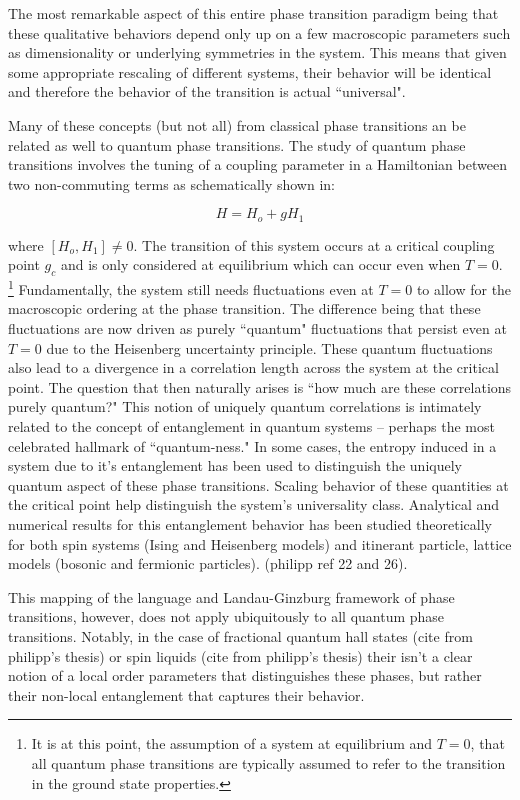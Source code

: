 The most remarkable aspect of this entire phase transition paradigm being that these qualitative behaviors depend only up on a few macroscopic parameters such as dimensionality or underlying symmetries in the system. This means that given some appropriate rescaling of different systems, their behavior will be identical and therefore the behavior of the transition is actual ``universal". 

Many of these concepts (but not all) from classical phase transitions an be related as well to quantum phase transitions. The study of quantum phase transitions involves the tuning of a coupling parameter in a Hamiltonian between two non-commuting terms as schematically shown in: 

\begin{equation}
\label{eqn:gHam}
H= H_o + g H_1
\end{equation}

where $ [H_o,H_1]\neq0$. The transition of this system occurs at a critical coupling point $g_c$ and is only considered at equilibrium which can occur even when $T=0$. \footnote{It is at this point, the assumption of a system at equilibrium and $T=0$, that all quantum phase transitions are typically assumed to refer to the transition in the ground state properties.} Fundamentally, the system still needs fluctuations even at $T=0$ to allow for the macroscopic ordering at the phase transition. The difference being that these fluctuations are now driven as purely ``quantum" fluctuations that persist even at $T=0$ due to the Heisenberg uncertainty principle. These quantum fluctuations also lead to a divergence in a correlation length across the system at the critical point. The question that then naturally arises is ``how much are these correlations purely quantum?" This notion of uniquely quantum correlations is intimately related to the concept of entanglement in quantum systems -- perhaps the most celebrated hallmark of ``quantum-ness." In some cases, the entropy induced in a system due to it's entanglement has been used to distinguish the uniquely quantum aspect of these phase transitions. Scaling behavior of these quantities at the critical point help distinguish the system's universality class. Analytical and numerical results for this entanglement behavior has been studied theoretically for both spin systems (Ising and Heisenberg models) and itinerant particle, lattice models (bosonic and fermionic particles). (philipp ref 22 and 26).

This mapping of the language and Landau-Ginzburg framework of  phase transitions, however, does not apply ubiquitously to all quantum phase transitions. Notably, in the case of fractional quantum hall states (cite from philipp's thesis) or spin liquids (cite from philipp's thesis) their isn't a clear notion of a local order parameters that distinguishes these phases, but rather their non-local entanglement that captures their behavior. 

